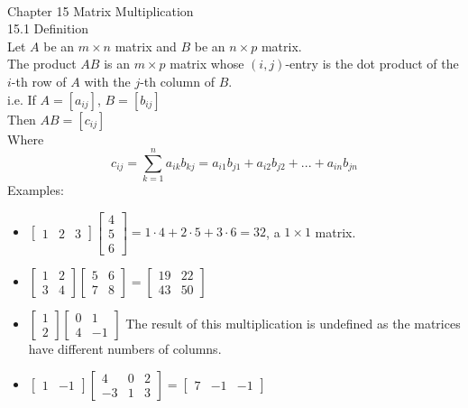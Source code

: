\documentclass[]{article}
\begin{document}
		\pagebreak\\
		\Large{Chapter 15 Matrix Multiplication}\\
		\large{15.1 Definition}\\
		\normalsize
		Let $A$ be an $m\times n$ matrix and $B$ be an $n\times p$ matrix.\\
		The product $AB$ is an $m\times p$ matrix whose $(i,j)$-entry is the dot product of the $i$-th row of $A$ with the $j$-th column of $B$.\\
		i.e. If $A=[a_{ij}]$, $B=[b_{ij}]$\\
		Then $AB=[c_{ij}]$\\
		Where
		\large$$
			c_{ij}=\sum^{n}_{k=1}a_{ik}b_{kj}=a_{i1}b_{j1}+a_{i2}b_{j2}+...+a_{in}b_{jn}
		$$
		\normalsize
		Examples:
		\begin{itemize}
			\item $\begin{bmatrix}{1}&{2}&{3}\end{bmatrix}\begin{bmatrix}{4}\\{5}\\{6}\end{bmatrix}=1\cdot 4+2\cdot 5+3\cdot 6=32$, a $1\times 1$ matrix.
			\item $\begin{bmatrix}{1}&{2}\\{3}&{4}\end{bmatrix}\begin{bmatrix}{5}&{6}\\{7}&{8}\end{bmatrix}=\begin{bmatrix}{19}&{22}\\{43}&{50}\end{bmatrix}$
			\item $\begin{bmatrix}{1}\\{2}\end{bmatrix}\begin{bmatrix}{0}&{1}\\{4}&{-1}\end{bmatrix}$ The result of this multiplication is undefined as the matrices have different numbers of columns.
			\item $\begin{bmatrix}{1}&{-1}\end{bmatrix}\begin{bmatrix}{4}&{0}&{2}\\{-3}&{1}&{3}\end{bmatrix}=\begin{bmatrix}{7}&{-1}&{-1}\end{bmatrix}$

\end{itemize}
\end{document}

